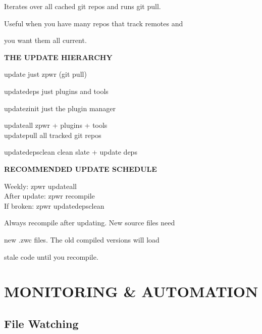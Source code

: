 \documentclass[11pt,a4paper,twoside]{book}
\begin{document}
Iterates over all cached git repos and runs git pull.

Useful when you have many repos that track remotes and

you want them all current.


\vspace{12pt}
{\bfseries\color{neonyellow} THE UPDATE HIERARCHY}\vspace{4pt}

\begin{codebox}
update              just zpwr (git pull)\\
\end{codebox}

updatedeps          just plugins and tools

updatezinit         just the plugin manager

\begin{codebox}
updateall           zpwr + plugins + tools\\
updatepull          all tracked git repos\\
\end{codebox}

updatedepsclean     clean slate + update deps


\vspace{12pt}
{\bfseries\color{neonyellow} RECOMMENDED UPDATE SCHEDULE}\vspace{4pt}

\begin{codebox}
Weekly:      zpwr updateall\\
After update: zpwr recompile\\
If broken:   zpwr updatedepsclean\\
\end{codebox}

Always recompile after updating. New source files need

new .zwc files. The old compiled versions will load

stale code until you recompile.


\vspace{16pt}


\chapter{MONITORING \& AUTOMATION}

\section{File Watching}
\end{document}
